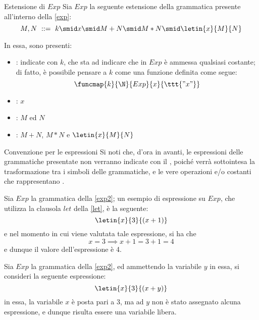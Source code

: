\documentclass[a4paper, 12pt]{report}
\begin{document}
    \begin{frameddefn}[label={exp2}]{Estensione di $Exp$}
        Sia $Exp$ la seguente estensione della grammatica presente all'interno della \cref{exp}: $$M, N \ ::= \ k \smid x \smid M + N \smid M * N \smid \letin{x}{M}{N}$$

        In essa, sono presenti:

        \begin{itemize}
            \item {}: indicate con $k$, che sta ad indicare che in $Exp$ è ammessa qualsiasi costante; di fatto, è possibile pensare a $k$ come una funzione definita come segue: $$\funcmap{k}{\N}{Exp}{x}{\ttt{"x"}}$$
            \item {}: $x$
            \item {}: $M$ ed $N$
            \item {}: $M + N$, $M * N$ e $\letin{x}{M}{N}$
        \end{itemize}
    \end{frameddefn}

    \begin{framedobs}{Convenzione per le espressioni}
        Si noti che, d'ora in avanti, le espressioni delle grammatiche presentate non verranno indicate con il , poiché verrà sottointesa la trasformazione tra i simboli  delle grammatiche, e le vere operazioni e/o costanti che rappresentano .
    \end{framedobs}

    \begin{example}
        Sia $Exp$ la grammatica della \cref{exp2}; un esempio di espressione su $Exp$, che utilizza la clausola $let$ della \cref{let}, è la seguente: $$\letin{x}{3}{(x + 1)}$$ e nel momento in cui viene valutata tale espressione, si ha che $$x = 3 \implies x + 1 = 3 + 1 = 4$$ e dunque il valore dell'espressione è 4.
    \end{example}

    \begin{example}
        Sia $Exp$ la grammatica della \cref{exp2}, ed ammettendo la variabile $y$ in essa, si consideri la seguente espressione: $$\letin{x}{3}{(x + y)}$$ in essa, la variabile $x$ è posta pari a 3, ma ad $y$ non è stato assegnato alcuna espressione, e dunque risulta essere una variabile libera.
    \end{example}
\end{document}
